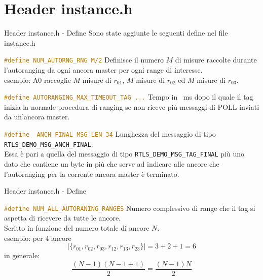 \section{Header instance.h}
\begin{frame}[fragile, shrink=10]{Header instance.h - Define}
  Sono state aggiunte le seguenti define nel file instance.h

  \begin{block}{\lstinline[language=C]!#define NUM_AUTORNG_RNG M/2!}
  Definisce il numero $M$ di misure raccolte durante l'autoranging da ogni ancora master per ogni range di interesse.\\
  \textcolor{dgreen}{esempio:} A0 raccoglie $M$ misure di $r_{01}$, $M$ misure di $r_{02}$ ed $M$ misure di $r_{03}$.
  \end{block}

  \begin{block}{\lstinline[language=C]!#define AUTORANGING_MAX_TIMEOUT_TAG ...!}
  Tempo in \SI{}{\milli\second} dopo il quale il tag inizia la normale procedura di ranging se non
  riceve più messaggi di POLL inviati da un'ancora master.
  \end{block}

  \begin{block}{\lstinline[language=C]!#define  ANCH_FINAL_MSG_LEN 34!}
    Lunghezza del messaggio di tipo \lstinline[language=C]!RTLS_DEMO_MSG_ANCH_FINAL!.\\
    Essa è pari a quella del messaggio di tipo \lstinline[language=C]!RTLS_DEMO_MSG_TAG_FINAL! più uno dato
    che contiene un byte in più che serve ad indicare alle ancore che l'autoranging per la corrente
    ancora master è terminato.
  \end{block}
\end{frame}

\begin{frame}[fragile]{Header instance.h - Define}
  \begin{block}{\lstinline[language=C]!#define NUM_ALL_AUTORANING_RANGES!}
  Numero complessivo di range che il tag si aspetta di ricevere da tutte le ancore.\\
  Scritto in funzione del numero totale di ancore $N$.\\
  \textcolor{dgreen}{esempio:} per $4$ ancore
  \[
  |\{r_{01}, r_{02}, r_{03}, r_{12}, r_{13}, r_{23}\}| = 3 + 2 + 1 = 6
  \]
  \alert{in generale:}
  \[
  \frac{(N-1) (N-1+1)}{2} = \frac{(N-1)N}{2}
  \]
  \end{block}
\end{frame}

